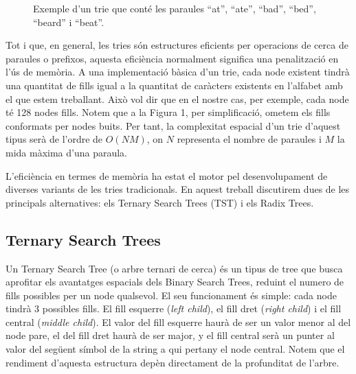 \begin{figure}[h]
\centering
{}
\caption{Exemple d'un trie que conté les paraules ``at'', ``ate'', ``bad'', ``bed'', ``beard'' i ``beat''.}
\end{figure}

Tot i que, en general, les tries són estructures eficients per operacions de cerca de paraules o prefixos, aquesta eficiència normalment significa una penalització en l'ús de memòria. A una implementació bàsica d'un trie, cada node existent tindrà una quantitat de fills igual a la quantitat de caràcters existents en l'alfabet amb el que estem treballant. Això vol dir que en el nostre cas, per exemple, cada node té 128 nodes fills. Notem que a la Figura 1, per simplificació, ometem els fills conformats per nodes buits. 
Per tant, la complexitat espacial d'un trie d'aquest tipus serà de l'ordre de $ O(NM) $, on $N$ representa el nombre de paraules i $M$ la mida màxima d'una paraula. 
 
L'eficiència en termes de memòria ha estat el motor pel desenvolupament de diverses variants de les tries tradicionals. En aquest treball discutirem dues de les principals alternatives: els Ternary Search Trees (TST) i els Radix Trees. 
\subsection{Ternary Search Trees}
Un Ternary Search Tree (o arbre ternari de cerca) és un tipus de tree que busca aprofitar els avantatges espacials dels Binary Search Trees, reduint el numero de fills possibles per un node qualsevol. 
El seu funcionament és simple: cada node tindrà 3 possibles fills. El fill esquerre (\textit{left child}), el fill dret (\textit{right child}) i el fill central (\textit{middle child}). El valor del fill esquerre haurà de ser un valor menor al del node pare, el del fill dret haurà de ser major, y el fill central serà un punter al valor del següent símbol de la string a qui pertany el node central.
Notem que el rendiment d'aquesta estructura depèn directament de la profunditat de l'arbre.  

